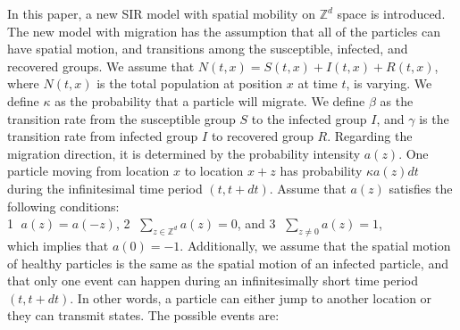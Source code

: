 \documentclass[sn-basic]{sn-jnl}%
\theoremstyle{thmstyleone}%
\theoremstyle{thmstyletwo}%
\theoremstyle{thmstylethree}%
\numberwithin{equation}{theorem}
\begin{document}
In this paper, a new SIR model with spatial mobility on $\mathbb{Z}^d$ space is introduced. The new model with migration has the assumption that all of the particles can have spatial motion, and transitions among the susceptible, infected, and recovered groups. We assume that $N(t,x) = S(t,x)+ I(t,x)+R(t,x)$, where $N(t,x)$ is the total population at position $x$ at time $t$, is varying. We define $\kappa$ as the probability that a particle will migrate. We define $\beta$ as the transition rate from the susceptible group $S$ to the infected group $I$, and $\gamma$ is the transition rate from infected group $I$ to recovered group $R$. Regarding the migration direction, it is determined by the probability intensity $a(z)$. One particle moving from location $x$ to location $x+z$ has probability $\kappa a(z)dt$ during the infinitesimal time period $(t, t+dt)$. Assume that $a(z)$ satisfies the following conditions:\\
\indent\quad \quad \textcircled{1} $a(z) = a(-z)$, \quad \textcircled{2} $\sum\limits_{z \in \mathbb{Z}^d} a(z)=0$, \quad and \quad \textcircled{3} $\sum\limits_{z \neq 0} a(z)=1$, \quad \\
which implies that $a(0)=-1$. Additionally, we assume that the spatial motion of healthy particles is the same as the spatial motion of an infected particle, and that only one event can happen during an infinitesimally short time period $(t, t+dt)$. In other words, a particle can either jump to another location or they can transmit states. The possible events are:
\end{document}
